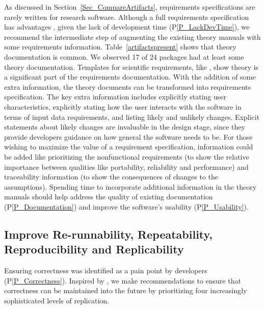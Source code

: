 \documentclass[final, 3p, times, authoryear]{elsarticle}
\newcommand{\ppref}[1]{P\ref{#1}}
\begin{document}
As discussed in Section~\ref{Sec_CompareArtifacts}, requirements specifications
are rarely written for research software. Although a full requirements
specification has advantages \citep{SmithEtAl2007, SmithAndLai2005},
given the lack of development time (\ppref{P_LackDevTime}), we recommend the
intermediate step of augmenting the existing theory manuals with some
requirements information.  Table~\ref{artifactspresent} shows that theory
documentation is common.  We observed 17 of 24 packages had at least some theory
documentation. Templates for scientific requirements, like \citet{SmithEtAl2007,
SmithAndLai2005}, show theory is a significant part of the requirements
documentation. With the addition of some extra information, the theory documents
can be transformed into requirements specification.  The key extra information
includes explicitly stating user characteristics, explicitly stating how the
user interacts with the software in terms of input data requirements, and
listing likely and unlikely changes.  Explicit statements about likely changes
are invaluable in the design stage, since they provide developers guidance on
how general the software needs to be.  For those wishing to maximize the value
of a requirement specification, information could be added like prioritizing the
nonfunctional requirements (to show the relative importance between qualities
like portability, reliability and performance) and traceability information (to
show the consequences of changes to the assumptions). Spending time to
incorporate additional information in the theory manuals should help address the
quality of existing documentation (\ppref{P_Documentation})  and improve the
software's usability (\ppref{P_Usability}).

\subsection{Improve Re-runnability, Repeatability, Reproducibility and Replicability}

Ensuring correctness was identified as a pain point by developers
(\ppref{P_Correctness}).  Inspired by \citet{BenureauAndRougier2017}, we make
recommendations to ensure that correctness can be maintained into the future by
prioritizing four increasingly sophisticated levels of replication.
\end{document}
